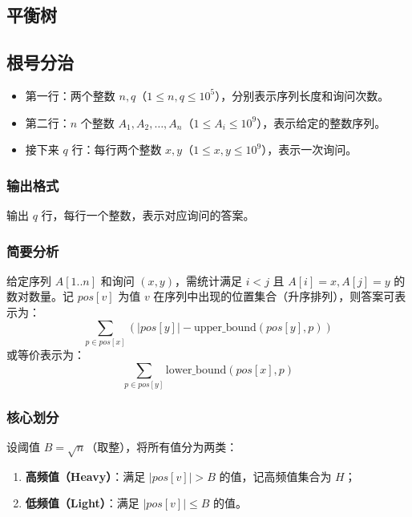 \documentclass[11pt,a4paper,twocolumn]{ctexart}  %
\begin{document}



\subsection{平衡树}




\subsection{根号分治}


\begin{itemize}
    \item 第一行：两个整数 $n, q$（$1 \le n, q \le 10^5$），分别表示序列长度和询问次数。
    \item 第二行：$n$ 个整数 $A_1, A_2, \dots, A_n$（$1 \le A_i \le 10^9$），表示给定的整数序列。
    \item 接下来 $q$ 行：每行两个整数 $x, y$（$1 \le x, y \le 10^9$），表示一次询问。
\end{itemize}

\subsubsection*{输出格式}
输出 $q$ 行，每行一个整数，表示对应询问的答案。

\subsubsection*{简要分析}
给定序列 $A[1..n]$ 和询问 $(x,y)$，需统计满足 $i<j$ 且 $A[i]=x, A[j]=y$ 的数对数量。记 $pos[v]$ 为值 $v$ 在序列中出现的位置集合（升序排列），则答案可表示为：
\[
\sum_{p \in pos[x]} \left( |pos[y]| - \text{upper\_bound}(pos[y], p) \right)
\]
或等价表示为：
\[
\sum_{p \in pos[y]} \text{lower\_bound}(pos[x], p)
\]

\subsubsection*{核心划分}
设阈值 $B = \sqrt{n}$（取整），将所有值分为两类：
\begin{enumerate}
    \item \textbf{高频值（Heavy）}：满足 $|pos[v]| > B$ 的值，记高频值集合为 $H$；
    \item \textbf{低频值（Light）}：满足 $|pos[v]| \le B$ 的值。
\end{enumerate}
\end{document}
